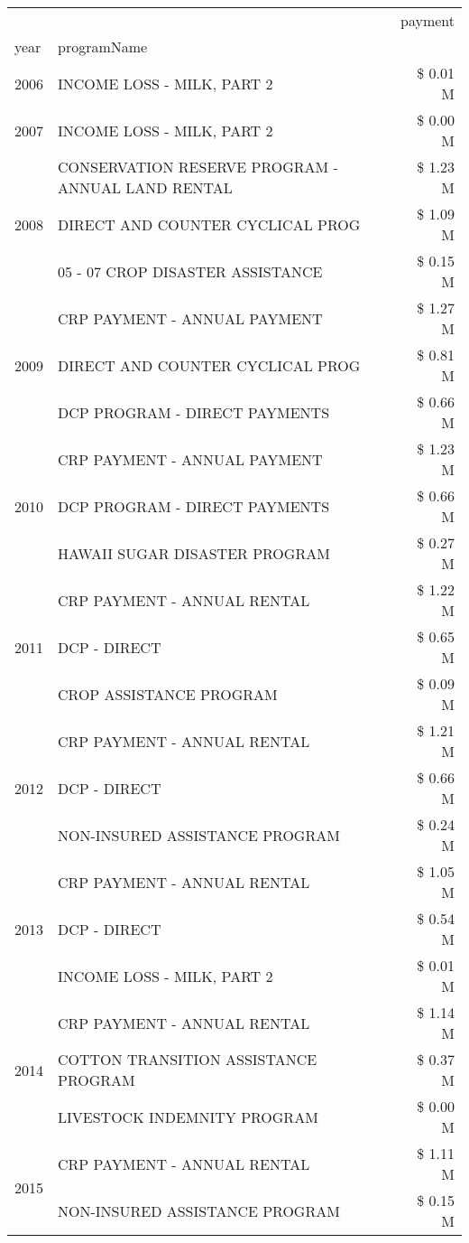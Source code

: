 \begin{tabular}{llr}
\toprule
 &  & payment \\
year & programName &  \\
\midrule
2006 & INCOME LOSS - MILK, PART 2 & \$ 0.01 M \\
\cline{1-3}
2007 & INCOME LOSS - MILK, PART 2 & \$ 0.00 M \\
\cline{1-3}
\multirow[t]{3}{*}{2008} & CONSERVATION RESERVE PROGRAM - ANNUAL LAND RENTAL & \$ 1.23 M \\
 & DIRECT AND COUNTER CYCLICAL PROG & \$ 1.09 M \\
 & 05 - 07 CROP DISASTER ASSISTANCE & \$ 0.15 M \\
\cline{1-3}
\multirow[t]{3}{*}{2009} & CRP PAYMENT - ANNUAL PAYMENT & \$ 1.27 M \\
 & DIRECT AND COUNTER CYCLICAL PROG & \$ 0.81 M \\
 & DCP PROGRAM - DIRECT PAYMENTS & \$ 0.66 M \\
\cline{1-3}
\multirow[t]{3}{*}{2010} & CRP PAYMENT - ANNUAL PAYMENT & \$ 1.23 M \\
 & DCP PROGRAM - DIRECT PAYMENTS & \$ 0.66 M \\
 & HAWAII SUGAR DISASTER PROGRAM & \$ 0.27 M \\
\cline{1-3}
\multirow[t]{3}{*}{2011} & CRP PAYMENT - ANNUAL RENTAL & \$ 1.22 M \\
 & DCP - DIRECT & \$ 0.65 M \\
 & CROP ASSISTANCE PROGRAM & \$ 0.09 M \\
\cline{1-3}
\multirow[t]{3}{*}{2012} & CRP PAYMENT - ANNUAL RENTAL & \$ 1.21 M \\
 & DCP - DIRECT & \$ 0.66 M \\
 & NON-INSURED ASSISTANCE PROGRAM & \$ 0.24 M \\
\cline{1-3}
\multirow[t]{3}{*}{2013} & CRP PAYMENT - ANNUAL RENTAL & \$ 1.05 M \\
 & DCP - DIRECT & \$ 0.54 M \\
 & INCOME LOSS - MILK, PART 2 & \$ 0.01 M \\
\cline{1-3}
\multirow[t]{3}{*}{2014} & CRP PAYMENT - ANNUAL RENTAL & \$ 1.14 M \\
 & COTTON TRANSITION ASSISTANCE PROGRAM & \$ 0.37 M \\
 & LIVESTOCK INDEMNITY PROGRAM & \$ 0.00 M \\
\cline{1-3}
\multirow[t]{3}{*}{2015} & CRP PAYMENT - ANNUAL RENTAL & \$ 1.11 M \\
 & NON-INSURED ASSISTANCE PROGRAM & \$ 0.15 M \\

\end{tabular}

